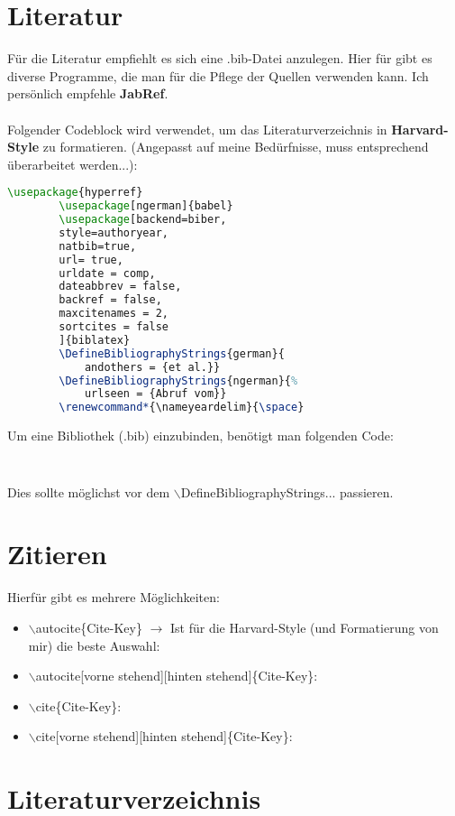 \documentclass{scrarticle}
\renewcommand*{\nameyeardelim}{\space}
\begin{document}
	\section{Literatur}
	Für die Literatur empfiehlt es sich eine .bib-Datei anzulegen. Hier für gibt es diverse Programme, die man für die Pflege der Quellen verwenden kann. Ich persönlich empfehle \textbf{JabRef}.\\\\\noindent
	Folgender Codeblock wird verwendet, um das Literaturverzeichnis in \textbf{Harvard-Style} zu formatieren. (Angepasst auf meine Bedürfnisse, muss entsprechend überarbeitet werden...):
	\begin{lstlisting}[language=TeX]
		\usepackage{hyperref}
		\usepackage[ngerman]{babel}
		\usepackage[backend=biber,
		style=authoryear,
		natbib=true,
		url= true,
		urldate = comp,
		dateabbrev = false,
		backref = false,
		maxcitenames = 2,
		sortcites = false
		]{biblatex}
		\DefineBibliographyStrings{german}{
			andothers = {et al.}}
		\DefineBibliographyStrings{ngerman}{%
			urlseen = {Abruf vom}}
		\renewcommand*{\nameyeardelim}{\space}
	\end{lstlisting}
	\vspace*{1cm}\noindent
	Um eine Bibliothek (.bib) einzubinden, benötigt man folgenden Code: 
	\begin{lstlisting}[language=TeX]
		
	\end{lstlisting}
	Dies sollte möglichst vor dem $\backslash$DefineBibliographyStrings... passieren.

	\section{Zitieren}
	Hierfür gibt es mehrere Möglichkeiten:
	\begin{itemize}
		\item $\backslash$autocite\{Cite-Key\} $\rightarrow$ Ist für die Harvard-Style (und Formatierung von mir) die beste Auswahl: \autocite{Beispiel}
		\item $\backslash$autocite[vorne stehend][hinten stehend]\{Cite-Key\}: \autocite[vgl.][S.42]{Beispiel}
		\item  $\backslash$cite\{Cite-Key\}: \cite{Beispiel}
		\item $\backslash$cite[vorne stehend][hinten stehend]\{Cite-Key\}: \cite[vgl.][S.42]{Beispiel}
	\end{itemize}
	
	\newpage
	
	\section{Literaturverzeichnis}
	\setcounter{biburllcpenalty}{9000}%
	\setcounter{biburlucpenalty}{9000}%
	\printbibliography[title=Literaturverzeichnis]
\end{document}
